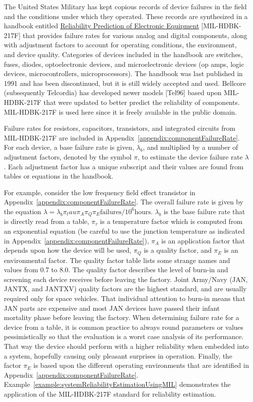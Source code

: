 {The United States Military has kept copious records of device failures
in the field and the conditions under which they operated. These records
are synthesized in a handbook entitled \ul{Reliability Prediction of
Electronic Equipment} {[}MIL-HDBK-217F{]} that provides failure rates
for various analog and digital components, along with adjustment factors
to account for operating conditions, the environment, and device
quality. Categories of devices included in the handbook are switches,
fuses, diodes, optoelectronic devices, and microelectronic devices (op
amps, logic devices, microcontrollers, microprocessors). The handbook
was last published in 1991 and has been discontinued, but it is still
widely accepted and used. Bellcore (subsequently Telcordia) has
developed newer models {[}Tel96{]} based upon MIL-HDBK-217F that were
updated to better predict the reliability of components. MIL-HDBK-217F
is used here since it is freely available in the public domain.

Failure rates for resistors, capacitors, transistors, and integrated
circuits from MIL-HDBK-217F are included in 
Appendix~\ref{appendix:componentFailureRate}. For each device,
a base failure rate is given, $\lambda_b$, and multiplied
by a number of adjustment factors, denoted by the symbol
$\pi$, to estimate the device failure
rate $\lambda$. Each adjustment factor has a unique subscript and their
values are found from tables or equations in the handbook.

For example, consider the low frequency field effect transistor in
Appendix~\ref{appendix:componentFailureRate}. The 
overall failure rate is given by the equation
$\lambda=\lambda_b \pi_tau \pi_A \pi_Q \pi_E \text{failures} /10^6 \text{hours}$.
$\lambda_b$  is the base failure rate that is directly read from a table, 
 $\pi_\tau$ is a temperature factor which is computed from an 
 exponential equation (be careful to use the junction temperature 
 as indicated in Appendix~\ref{appendix:componentFailureRate}),
$\pi_A$ is an application factor that depends upon how the device 
will be used, $\pi_Q$ is a quality factor, and $\pi_E$ is an 
environmental factor. The
quality factor table lists some strange names and values from 0.7 to
8.0. The quality factor describes the level of burn-in and screening
each device receives before leaving the factory. Joint Army/Navy (JAN,
JANTX, and JANTXV) quality factors are the highest standard, and are
usually required only for space vehicles. That individual attention to
burn-in means that JAN parts are expensive and most JAN devices have
passed their infant mortality phase before leaving the factory. When
determining failure rate for a device from a table, it is common
practice to always round parameters or values pessimistically so that
the evaluation is a worst case analysis of its performance. That way the
device should perform with a higher reliability when embedded into a
system, hopefully causing only pleasant surprises in operation. Finally,
the factor $\pi_E$ is based upon the
different operating environments that are identified in 
Appendix~\ref{appendix:componentFailureRate}.
Example~\ref{example:systemReliabilityEstimationUsingMIL} demonstrates 
the application of the MIL-HDBK-217F standard
for reliability estimation.

}
